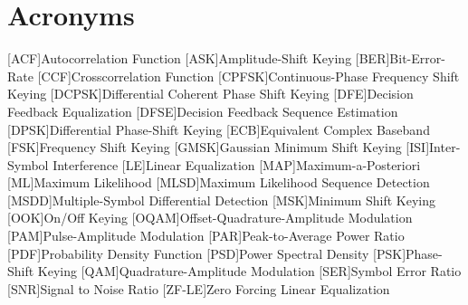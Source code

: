\chapter{Acronyms}
\begin{acronym}[DCPSK]
    [ACF]{Autocorrelation Function}
    [ASK]{Amplitude-Shift Keying}
    [BER]{Bit-Error-Rate}
    [CCF]{Crosscorrelation Function}
    [CPFSK]{Continuous-Phase Frequency Shift Keying}
    [DCPSK]{Differential Coherent Phase Shift Keying}
    [DFE]{Decision Feedback Equalization}
    [DFSE]{Decision Feedback Sequence Estimation}
    [DPSK]{Differential Phase-Shift Keying}
    [ECB]{Equivalent Complex Baseband}
    [FSK]{Frequency Shift Keying}
    [GMSK]{Gaussian Minimum Shift Keying}
    [ISI]{Inter-Symbol Interference}
    [LE]{Linear Equalization}
    [MAP]{Maximum-a-Posteriori}
    [ML]{Maximum Likelihood}
    [MLSD]{Maximum Likelihood Sequence Detection}
    [MSDD]{Multiple-Symbol Differential Detection}
    [MSK]{Minimum Shift Keying}
    [OOK]{On/Off Keying}
    [OQAM]{Offset-Quadrature-Amplitude Modulation}
    [PAM]{Pulse-Amplitude Modulation}
    [PAR]{Peak-to-Average Power Ratio}
    [PDF]{Probability Density Function}
    [PSD]{Power Spectral Density}
    [PSK]{Phase-Shift Keying}
    [QAM]{Quadrature-Amplitude Modulation}
    [SER]{Symbol Error Ratio}
    [SNR]{Signal to Noise Ratio}
    [ZF-LE]{Zero Forcing Linear Equalization}
\end{acronym}
